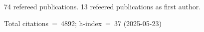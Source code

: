 74 refereed publications. 13 refeered publications as first author.

Total citations~=~4892; h-index~=~37 (2025-05-23)